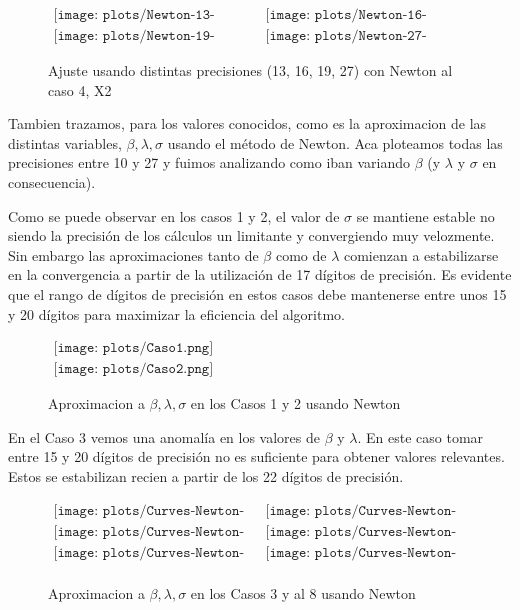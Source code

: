 \begin{figure} [H]
$\begin{array}{cc}
\texttt{[image: plots/Newton-13-caso4.png]} &
\texttt{[image: plots/Newton-16-caso4.png]} \\
\texttt{[image: plots/Newton-19-caso4.png]} &
\texttt{[image: plots/Newton-27-caso4.png]}
\end{array}$
\caption{Ajuste usando distintas precisiones (13, 16, 19, 27) con Newton al caso 4, X2}
\label{fig:FitCaso4Newton}
\end{figure}


Tambien trazamos, para los valores conocidos, como es la aproximacion de las distintas variables, $\beta, \lambda, \sigma$ usando el m\'etodo de Newton.
Aca ploteamos todas las precisiones entre 10 y 27 y fuimos analizando como iban variando $\beta$ (y $\lambda$ y $\sigma$ en consecuencia).

Como se puede observar en los casos 1 y 2, el valor de $\sigma$ se mantiene estable no siendo la precisi\'on de los c\'alculos un limitante y convergiendo muy velozmente. Sin embargo las aproximaciones tanto de $\beta$ como de $\lambda$ comienzan a estabilizarse en la convergencia a partir de la utilizaci\'on de 17 d\'igitos de precisi\'on. Es evidente que el rango de d\'igitos de precisi\'on en estos casos debe mantenerse entre unos 15 y 20 d\'igitos para maximizar la eficiencia del algoritmo.  

\begin{figure}
$\begin{array}{c}
\texttt{[image: plots/Caso1.png]} \\
\texttt{[image: plots/Caso2.png]}
\end{array}$

\caption{Aproximacion a $\beta, \lambda, \sigma$ en los Casos 1 y 2 usando Newton}
\end{figure}

En el Caso 3 vemos una anomal\'ia en los valores de $\beta$ y $\lambda$. En este caso tomar entre 15 y 20 d\'igitos de precisi\'on no es suficiente para obtener valores relevantes. Estos se estabilizan recien a partir de los 22 d\'igitos de precisi\'on.




\begin{figure}
$\begin{array}{cc}
\texttt{[image: plots/Curves-Newton-Caso3.png]} &
\texttt{[image: plots/Curves-Newton-Caso4.png]} \\
\texttt{[image: plots/Curves-Newton-Caso5.png]} &
\texttt{[image: plots/Curves-Newton-Caso6.png]} \\
\texttt{[image: plots/Curves-Newton-Caso7.png]} &
\texttt{[image: plots/Curves-Newton-Caso8.png]} \\

\end{array}$

\caption{Aproximacion a $\beta, \lambda, \sigma$ en los Casos 3 y al 8 usando Newton}
\label{fig:AproxCaso1}
\end{figure}



